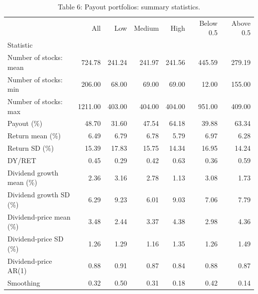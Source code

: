 \begin{table}
\caption{Table 6: Payout portfolios: summary statistics.}
\label{tab:replication_6}
\begin{tabular}{lrrrrrr}
\toprule
 & All & Low & Medium & High & Below 0.5 & Above 0.5 \\
Statistic &  &  &  &  &  &  \\
\midrule
Number of stocks: mean & 724.78 & 241.24 & 241.97 & 241.56 & 445.59 & 279.19 \\
Number of stocks: min & 206.00 & 68.00 & 69.00 & 69.00 & 12.00 & 155.00 \\
Number of stocks: max & 1211.00 & 403.00 & 404.00 & 404.00 & 951.00 & 409.00 \\
Payout (\%) & 48.70 & 31.60 & 47.54 & 64.18 & 39.88 & 63.34 \\
Return mean (\%) & 6.49 & 6.79 & 6.78 & 5.79 & 6.97 & 6.28 \\
Return SD (\%) & 15.39 & 17.83 & 15.75 & 14.34 & 16.95 & 14.24 \\
DY/RET & 0.45 & 0.29 & 0.42 & 0.63 & 0.36 & 0.59 \\
Dividend growth mean (\%) & 2.36 & 3.16 & 2.78 & 1.13 & 3.08 & 1.73 \\
Dividend growth SD (\%) & 6.29 & 9.23 & 6.01 & 9.03 & 7.06 & 7.79 \\
Dividend-price mean (\%) & 3.48 & 2.44 & 3.37 & 4.38 & 2.98 & 4.36 \\
Dividend-price SD (\%) & 1.26 & 1.29 & 1.16 & 1.35 & 1.26 & 1.49 \\
Dividend-price AR(1) & 0.88 & 0.91 & 0.87 & 0.84 & 0.88 & 0.87 \\
Smoothing & 0.32 & 0.50 & 0.31 & 0.18 & 0.42 & 0.14 \\
\bottomrule
\end{tabular}
\end{table}

